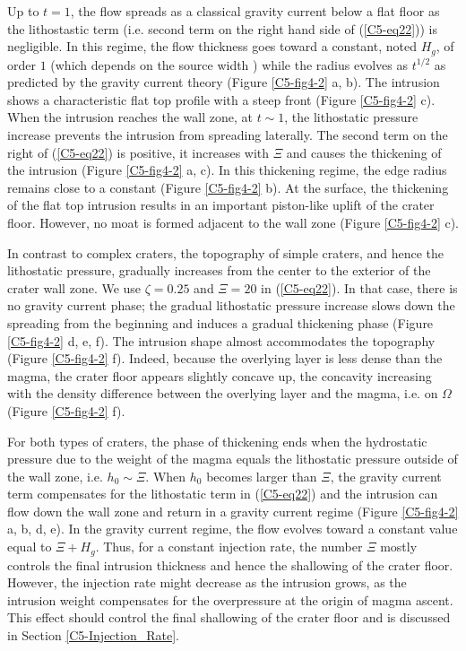 Up to $t=1$,  the flow spreads as a classical  gravity current below a
flat floor  as the lithostastic term  (i.e.  second term on  the right
hand side of (\ref{C5-eq22})) is  negligible. In this regime, the flow
thickness goes  toward a  constant, noted $H_g$,  of order  $1$ (which
depends on  the source width \citep{Michaut:2009jx})  while the radius
evolves  as  $t^{1/2}$ as  predicted  by  the gravity  current  theory
\citep{Huppert:1982a}  (Figure \ref{C5-fig4-2}  a, b).   The intrusion
shows a  characteristic flat  top profile with  a steep  front (Figure
\ref{C5-fig4-2}  c).  When  the intrusion  reaches the  wall zone,  at
$t\sim1$,  the lithostatic  pressure increase  prevents the  intrusion
from  spreading   laterally.   The  second   term  on  the   right  of
(\ref{C5-eq22}) is  positive, it increases  with $\Xi$ and  causes the
thickening of  the intrusion (Figure  \ref{C5-fig4-2} a, c).   In this
thickening regime, the edge radius remains close to a constant (Figure
\ref{C5-fig4-2} b).   At the surface,  the thickening of the  flat top
intrusion results  in an  important piston-like  uplift of  the crater
floor. However,  no moat is formed  adjacent to the wall  zone (Figure
\ref{C5-fig4-2} c).
		 
In contrast to complex craters,  the topography of simple craters, and
hence the lithostatic pressure, gradually increases from the center to
the  exterior  of the  crater  wall  zone.   We use  $\zeta=0.25$  and
$\Xi=20$ in (\ref{C5-eq22}). In that case, there is no gravity current
phase;  the  gradual  lithostatic  pressure increase  slows  down  the
spreading from  the beginning and  induces a gradual  thickening phase
(Figure  \ref{C5-fig4-2}  d,  e,   f).   The  intrusion  shape  almost
accommodates  the  topography  (Figure  \ref{C5-fig4-2}  f).   Indeed,
because the overlying  layer is less dense than the  magma, the crater
floor appears slightly  concave up, the concavity  increasing with the
density difference between the overlying  layer and the magma, i.e. on
$\Omega$ (Figure \ref{C5-fig4-2} f).

For  both types  of craters,  the phase  of thickening  ends when  the
hydrostatic  pressure  due to  the  weight  of  the magma  equals  the
lithostatic pressure outside of the wall zone, i.e.  $h_{0} \sim \Xi$.
When  $h_{0} $  becomes larger  than $\Xi$,  the gravity  current term
compensates  for  the  lithostatic  term in  (\ref{C5-eq22})  and  the
intrusion can flow down the wall  zone and return in a gravity current
regime (Figure  \ref{C5-fig4-2} a, b,  d, e).  In the  gravity current
regime, the flow evolves toward a constant value equal to $\Xi + H_g$.
Thus, for a constant injection  rate, the number $\Xi$ mostly controls
the final intrusion  thickness and hence the shallowing  of the crater
floor.  However,  the injection rate  might decrease as  the intrusion
grows, as the intrusion weight compensates for the overpressure at the
origin  of  magma  ascent.   This  effect  should  control  the  final
shallowing  of   the  crater  floor   and  is  discussed   in  Section
\ref{C5-Injection_Rate}.
	
